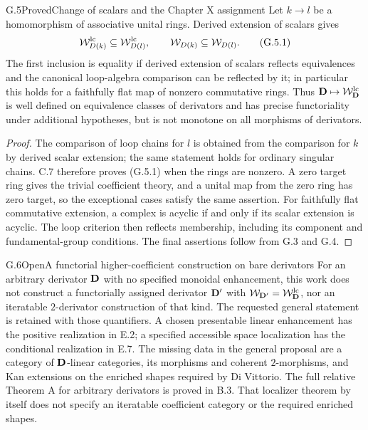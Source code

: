 \begin{claim}{G.5}{Proved}{Change of scalars and the Chapter X assignment}
Let $k\to l$ be a homomorphism of associative unital rings. Derived
extension of scalars gives
\[
 \mathcal W_{D(k)}^{\mathrm{lc}}\subseteq\mathcal W_{D(l)}^{\mathrm{lc}},
 \qquad \mathcal W_{D(k)}\subseteq\mathcal W_{D(l)}.
 \tag{G.5.1}
\]
The first inclusion is equality if derived extension of scalars
reflects equivalences and the canonical loop-algebra comparison
can be reflected by it; in particular this holds for a faithfully
flat map of nonzero commutative rings. Thus $\mathbf D\mapsto\mathcal W_{\mathbf D}^{\mathrm{lc}}$ is
well defined on equivalence classes of derivators and has precise
functoriality under additional hypotheses, but is not monotone on
all morphisms of derivators.
\end{claim}
\begin{proof}
The comparison of loop chains for $l$ is obtained from the
comparison for $k$ by derived scalar extension; the same statement
holds for ordinary singular chains. C.7 therefore proves (G.5.1)
when the rings are nonzero. A zero target ring gives the trivial
coefficient theory, and a unital map from the zero ring has zero
target, so the exceptional cases satisfy the same assertion.
For faithfully flat commutative extension, a complex is acyclic
if and only if its scalar extension is acyclic. The loop criterion
then reflects membership, including its component and
fundamental-group conditions. The final assertions follow from
G.3 and G.4.
\end{proof}

\begin{claim}{G.6}{Open}{A functorial higher-coefficient construction on bare derivators}
For an arbitrary derivator $\mathbf D$ with no specified monoidal
enhancement, this work does not construct a functorially assigned
derivator $\mathbf D'$ with $\mathcal W_{\mathbf D'}=\mathcal W_{\mathbf D}^{\mathrm{lc}}$, nor an iteratable
$2$-derivator construction of that kind. The requested general
statement is retained with those quantifiers. A chosen presentable
linear enhancement has the positive realization in E.2; a specified
accessible space localization has the conditional realization in E.7.
The missing data in the general proposal are a category of
$\mathbf D$-linear categories, its morphisms and coherent $2$-morphisms,
and Kan extensions on the enriched shapes required by Di Vittorio.
The full relative Theorem A for arbitrary derivators is proved
in B.3. That localizer theorem by itself does not specify an
iteratable coefficient category or the required enriched shapes.
\end{claim}
